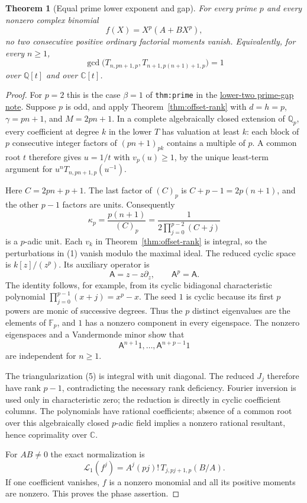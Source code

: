 \documentclass[11pt]{article}
\newtheorem{theorem}{Theorem}
\begin{document}
\begin{theorem}[Equal prime lower exponent and gap]\label{thm:diagonal-prime}
For every prime $p$ and every nonzero complex binomial
\[
 f(X)=X^p(A+BX^p),
\]
no two consecutive positive ordinary factorial moments vanish.
Equivalently, for every $n\ge1$,
\[
 \gcd\bigl(T_{n,pn+1,p},T_{n+1,p(n+1)+1,p}\bigr)=1
\]
over $\mathbb Q[t]$ and over $\mathbb C[t]$.
\end{theorem}
\begin{proof}
For $p=2$ this is the case $\beta=1$ of
\texttt{thm:prime} in the
\href{LOWER_TWO_PRIME_GAP_SFC.tex}{lower-two prime-gap note}.
Suppose $p$ is odd, and apply Theorem~\ref{thm:offset-rank}
with $d=h=p$, $\gamma=pn+1$, and $M=2pn+1$.
In a complete algebraically closed extension of $\mathbb Q_p$,
every coefficient at degree $k$ in the lower $T$ has valuation
at least $k$: each block of $p$ consecutive integer factors
of $(pn+1)_{pk}$ contains a multiple of $p$.
A common root $t$ therefore gives $u=1/t$ with $v_p(u)\ge1$,
by the unique least-term argument for
$u^nT_{n,pn+1,p}(u^{-1})$.

Here $C=2pn+p+1$. The last factor of $(C)_p$ is
$C+p-1=2p(n+1)$, and the other $p-1$ factors are units.
Consequently
\[
 \kappa_p=\frac{p(n+1)}{(C)_p}
     =\frac1{2\prod_{j=0}^{p-2}(C+j)}
\]
is a $p$-adic unit. Each $v_k$ in Theorem~\ref{thm:offset-rank}
is integral, so the perturbations in (1) vanish modulo the
maximal ideal. The reduced cyclic space is $k[z]/(z^p)$.
Its auxiliary operator is
\[
 {\mathsf A}=z-z\partial_z,
 \qquad {\mathsf A}^p={\mathsf A}.
\]
The identity follows, for example, from its cyclic bidiagonal
characteristic polynomial
$\prod_{j=0}^{p-1}(x+j)=x^p-x$.
The seed $1$ is cyclic because its first $p$ powers are monic
of successive degrees. Thus the $p$ distinct eigenvalues are
the elements of $\mathbb F_p$, and $1$ has a nonzero component
in every eigenspace. The nonzero eigenspaces and a Vandermonde
minor show that
\[
 {\mathsf A}^{n+1}1,\ldots,{\mathsf A}^{n+p-1}1
\]
are independent for $n\ge1$.

The triangularization (5) is integral with unit diagonal.
The reduced $J_j$ therefore have rank $p-1$, contradicting
the necessary rank deficiency. Fourier inversion is used only
in characteristic zero; the reduction is directly in cyclic
coefficient columns. The polynomials have rational coefficients;
absence of a common root over this algebraically closed
$p$-adic field implies a nonzero rational resultant, hence
coprimality over $\mathbb C$.

For $AB\ne0$ the exact normalization is
\[
 \mathcal L_1(f^j)=A^j(pj)!\,T_{j,pj+1,p}(B/A).
\]
If one coefficient vanishes, $f$ is a nonzero monomial and all
its positive moments are nonzero. This proves the phase assertion.
\end{proof}
\end{document}
